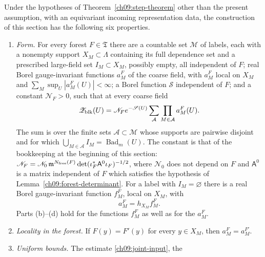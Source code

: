 \begin{assumption}
\label{ch09:forest-assumption}
%
Under the hypotheses of Theorem~\ref{ch09:step-theorem} other than the
present assumption, with an equivariant incoming representation
data, the construction of this section has the following six
properties.
\begin{enumerate}[label=\textup{(\alph*)}]
\item \emph{Form.} For every forest $F\in\mathfrak T$ there are a
 countable set $\mathcal M$ of labels, each with a nonempty support
 $X_M\subset\Lambda$ containing its full dependence set and a
 prescribed large-field set $I_M\subset X_M$, possibly empty,
 all independent of $F$; real Borel gauge-invariant functions $a_M^F$
 of the coarse field, with $a_M^F$ local on $X_M$ and
 $\sum_M\sup_U|a_M^F(U)|<\infty$; a Borel function $\mathscr S$
 independent of $F$; and a constant $\mathscr N_F>0$, such that at every
 coarse field
 \begin{equation}
  \mathscr Z_{\rm blk}(U)=\mathscr N_Fe^{-\mathscr S(U)}
   \sum_{\mathcal A}\prod_{M\in\mathcal A}a_M^F(U).
  \label{ch09:fixed-forest-gas}
 \end{equation}
 The sum is over the finite sets $\mathcal A\subset\mathcal M$ whose
 supports are pairwise disjoint and for which
 $\bigcup_{M\in\mathcal A}I_M=\operatorname{Bad}_m(U)$. The constant is
 that of the bookkeeping at the beginning of this section:
 $\mathscr N_F=\mathscr N_0\,\mathfrak m^{N_{\rm free}(F)}
 \det(\iota_F^*\mathsf A^0\iota_F)^{-1/2}$, where $\mathscr N_0$ does
 not depend on $F$ and $\mathsf A^0$ is a matrix independent of $F$
 which satisfies the hypothesis of Lemma~\ref{ch09:forest-determinant}.
 For a label with $I_M=\varnothing$ there is a real Borel
 gauge-invariant function $f_M^F$, local on $X_M$, with
 \begin{equation}
  a_M^F=h_{X_M}f_M^F .
  \label{ch09:mask-form}
 \end{equation}
 Parts \textup{(b)}--\textup{(d)} hold for the functions $f_M^F$ as
 well as for the $a_M^F$.
\item \emph{Locality in the forest.} If $F(y)=F'(y)$ for every
 $y\in X_M$, then $a_M^F=a_M^{F'}$.
\item \emph{Uniform bounds.} The estimate \eqref{ch09:joint-input}, the

\end{enumerate}
\end{assumption}
